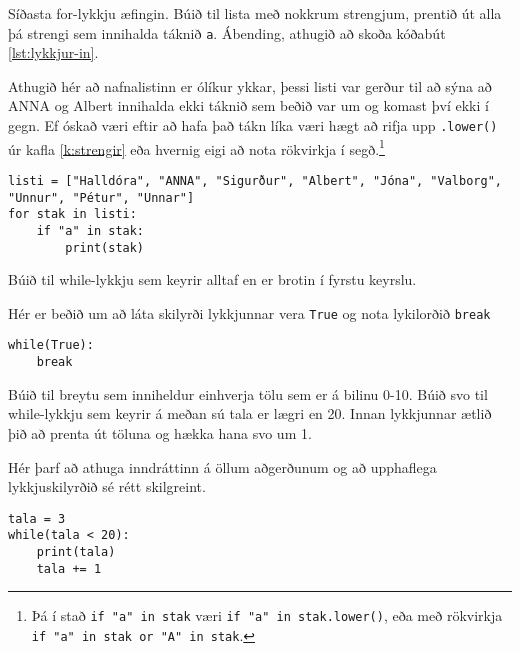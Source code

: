 \begin{exercise}\label{lyk5}
Síðasta for-lykkju æfingin.
Búið til lista með nokkrum strengjum, prentið út alla þá strengi sem innihalda táknið \texttt{a}.
Ábending, athugið að skoða kóðabút \ref{lst:lykkjur-in}.
\end{exercise}
\begin{Answer}[ref={lyk5}]
Athugið hér að nafnalistinn er ólíkur ykkar, þessi listi var gerður til að sýna að ANNA og Albert innihalda ekki táknið sem beðið var um og komast því ekki í gegn.
Ef óskað væri eftir að hafa það tákn líka væri hægt að rifja upp \texttt{.lower()} úr kafla \ref{k:strengir} eða hvernig eigi að nota rökvirkja í segð.\footnote{Þá í stað \texttt{if "a" in stak} væri \texttt{if "a" in stak.lower()}, eða með rökvirkja \texttt{if "a" in stak or "A" in stak}.}
	
\begin{lstlisting}
listi = ["Halldóra", "ANNA", "Sigurður", "Albert", "Jóna", "Valborg", "Unnur", "Pétur", "Unnar"]
for stak in listi:
	if "a" in stak:
		print(stak)\end{lstlisting}
\end{Answer}

\begin{exercise}\label{lyk6}
Búið til while-lykkju sem keyrir alltaf en er brotin í fyrstu keyrslu.
\end{exercise}
\begin{Answer}[ref={lyk6}]
Hér er beðið um að láta skilyrði lykkjunnar vera \texttt{True} og nota lykilorðið \texttt{break}
	
\begin{lstlisting}
while(True):
	break\end{lstlisting}
\end{Answer}

\begin{exercise}\label{lyk7}
Búið til breytu sem inniheldur einhverja tölu sem er á bilinu 0-10.
Búið svo til while-lykkju sem keyrir á meðan sú tala er lægri en 20.
Innan lykkjunnar ætlið þið að prenta út töluna og hækka hana svo um 1.
\end{exercise}
\begin{Answer}[ref={lyk7}]
Hér þarf að athuga inndráttinn á öllum aðgerðunum og að upphaflega lykkjuskilyrðið sé rétt skilgreint.
\begin{lstlisting}
tala = 3
while(tala < 20):
	print(tala)
	tala += 1\end{lstlisting}
\end{Answer}

